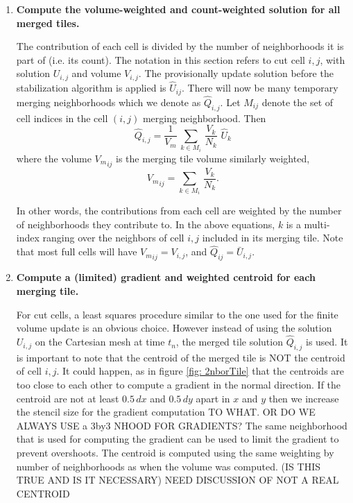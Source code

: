 \begin{enumerate}
\item
{\bf Compute the volume-weighted and count-weighted solution for all
merged tiles.}   

\vspace*{.1in}
The contribution of each cell is divided by the number of neighborhoods 
it is part of (i.e. its count). The notation in this section refers
to cut cell $i,j$, with solution $U_{i,j}$ and volume
$V_{i,j}$. 
The provisionally update solution before the
stabilization algorithm is applied is $\hat{U}_{ij}$.
There will now be many temporary merging neighborhoods which 
we denote as $\widehat{Q}_{i,j}$. 
Let $M_{ij}$ denote the set of cell indices in the cell $(i,j)$ merging
neighborhood.  Then
\begin{equation}
\label{tiledef}
\widehat{Q}_{i,j} =  \frac{1}{V_m} \, \sum_{k \in M_i} \,  
\frac{V_k}{N_k}  \,\,  \hat{U}_k
\end{equation}
where the volume ${V_m}_{ij}$ is the merging tile volume similarly weighted,
\begin{equation}
\label{voldef}
{V_m}_{ij}  =  \sum_{k \in M_i } \,  \frac{V_k}{N_k}  .
\end{equation}

In other words, the contributions from each cell are weighted by the
number of neighborhoods they contribute to.
In the above equations, $k$ is  a multi-index ranging over the neighbors 
of cell $i,j$ included in its merging tile.
Note that most full cells will have ${V_m}_{ij} = V_{i,j}$, 
and $\widehat{Q}_{ij}  = \bar{U}_{i,j}$.





\item
{\bf Compute a (limited) gradient and weighted centroid for each merging
tile.}

\vspace*{.1in}
For cut cells, a least squares procedure  similar to the one used for
the finite volume update is an obvious choice. However instead of using the
solution $U_{i,j}$ on the Cartesian mesh at time $t_n$,
the merged tile solution  $\widehat{Q}_{i,j}$ is used. It is important
to note that the centroid of the merged tile is NOT the 
centroid of cell ${i,j}$. It could happen, as in figure \ref{fig:
2nborTile} that the centroids are too close to each other to compute a
gradient in the normal direction. If the centroid are not at least
$0.5\,dx$  and $0.5\,dy$ apart in $x$ and $y$ then we increase the
stencil size for the gradient computation TO WHAT. OR DO WE ALWAYS USE a
3by3 NHOOD FOR GRADIENTS?
The same neighborhood that is used for computing the gradient can be
used to limit the gradient to prevent overshoots.
The centroid is computed using the same weighting by number of
neighborhoods as when the volume was computed. (IS THIS TRUE AND IS IT
NECESSARY) NEED DISCUSSION OF NOT A REAL CENTROID


\end{enumerate}
